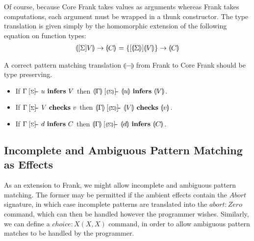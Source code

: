 \documentclass[preprint]{sigplanconf}
\makeatletter
\newcommand{\many}{\overline}
\newcommand{\pc}[1]{\llparenthesis{#1}\rrparenthesis}
\newcommand\ba{\begin{array}}
\newcommand\ea{\end{array}}
\newenvironment{equations}{\[\ba{@{}r@{~}c@{~}l@{}}}{\ea\]}
\newcommand{\judgeword}[1]{~\mathbf{#1}~}
\newcommand{\sigentails}[1]{\mathbin{[{\text{\scriptsize ${#1}$}}]\!\text{-\!-}}\,}
\newcommand{\makes}[4]  {#1 \sigentails{#2} {#3} \judgeword{infers} {#4}}
\newcommand{\has}[4] {#1 \sigentails{#2} {#3} \judgeword{checks} {#4}}
\newcommand{\can}[4]{#1 \sigentails{#2} {#3} \judgeword{infers} {#4}}
\newcommand{\does}[3]{#1 \vdash {#2} \judgeword{checks} {#3}}
\newcommand{\makesgs}{\makes{\Gamma}{\sigs}}
\newcommand{\hasgs}{\has{\Gamma}{\sigs}}
\newcommand{\cangs}{\can{\Gamma}{\sigs}}
\newcommand{\doesg}{\does{\Gamma}}
\newcommand{\sigs}{\Sigma}
\newcommand{\effbox}[1]{[#1]}
\newcommand{\var}{\mathit}
\newcommand{\thunk}[1]{\{{#1}\}}
\makeatother
\begin{document}
Of course, because Core Frank takes values as arguments whereas Frank
takes computations, each argument must be wrapped in a thunk
constructor.
%
The type translation is given simply by the homomorphic extension of the
following equation on function types:
\begin{equations}
\pc{\effbox{\sigs}V} \to \pc{C} &=& \thunk{\effbox{\pc{\sigs}}\pc{V}} \to \pc{C} \\
\end{equations}

A correct pattern matching translation $\pc{-}$ from Frank to Core
Frank should be type preserving.
\begin{itemize}
\item If $\makesgs{u}{V}$ then $\makes{\pc{\Gamma}}{\pc{\sigs}}{\pc{u}}{\pc{V}}$.
\item If $\hasgs{V}{v}$   then $\has{\pc{\Gamma}}{\pc{\sigs}}{\pc{V}}{\pc{v}}$.
\item If $\cangs{d}{C}$   then $\can{\pc{\Gamma}}{\pc{\sigs}}{\pc{d}}{\pc{C}}$.
\end{itemize}

\subsection{Incomplete and Ambiguous Pattern Matching as Effects}

As an extension to Frank, we might allow incomplete and ambiguous
pattern matching. The former may be permitted if the ambient effects
contain the $\var{Abort}$ signature, in which case incomplete patterns
are translated into the $\var{abort}:\var{Zero}$ command, which can
then be handled however the programmer wishes. Similarly, we can define
a $\var{choice}:X(X, X)$ command, in order to allow ambiguous pattern
matches to be handled by the programmer.

\end{document}
